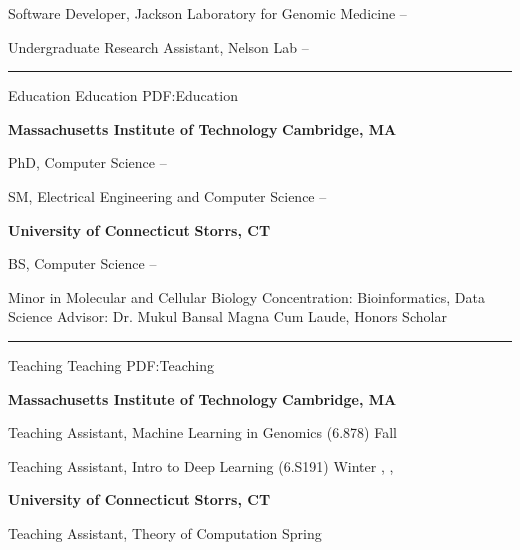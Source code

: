 \documentclass[letterpaper,MMMyyyy,nonstopmode]{simpleresumecv}
\begin{document}
\begin{Body}
\Gap
\Item Software Developer, Jackson Laboratory for Genomic Medicine
\hfill
{} --

\Gap
\Item Undergraduate Research Assistant, Nelson Lab
\hfill
{} --

\BigGap
\hrule
\Section
{Education}
{Education}
{PDF:Education}

\Entry
\textbf{Massachusetts Institute of Technology}
\hfill \textbf{Cambridge, MA}

\Gap
\Item PhD, Computer Science
\hfill
{} --
\Gap
\begin{Detail}
\end{Detail}
\Gap

\Item SM, Electrical Engineering and Computer Science
\hfill
{} --
\BigGap

\Entry
\textbf{University of Connecticut}
\hfill \textbf{Storrs, CT}

\Gap
\Item BS, Computer Science
\hfill
{} --
\Gap
\begin{Detail}
\SubBulletItem Minor in Molecular and Cellular Biology
\SubBulletItem Concentration: Bioinformatics, Data Science
\SubBulletItem Advisor: Dr. Mukul Bansal
\SubBulletItem Magna Cum Laude, Honors Scholar
\end{Detail}


\BigGap
\hrule
\Section
{Teaching}
{Teaching}
{PDF:Teaching}

\Entry
{\textbf{Massachusetts Institute of Technology}}
\hfill \textbf{Cambridge, MA}

\Gap
\Item Teaching Assistant, Machine Learning in Genomics (6.878)
\hfill
Fall 

\Gap
\Item Teaching Assistant, Intro to Deep Learning (6.S191)
\hfill
Winter , , 

\BigGap
\Entry
{\textbf{University of Connecticut}}
\hfill \textbf{Storrs, CT}

\Gap
\Item Teaching Assistant, Theory of Computation
\hfill
Spring 



\end{Body}
\end{document}
